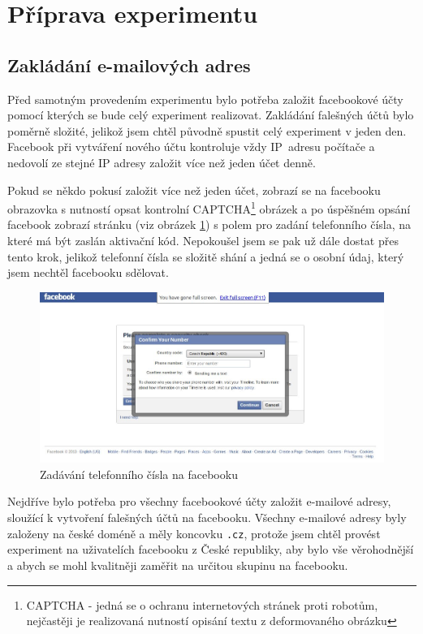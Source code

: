 \documentclass[thesis=M,czech]{FITthesis}[2013/05/10]
\begin{document}
\section{Příprava experimentu}

\subsection{Zakládání e-mailových adres}

Před samotným provedením experimentu bylo potřeba založit facebookové účty pomocí kterých se bude celý experiment realizovat. Zakládání falešných účtů bylo poměrně složité, jelikož jsem chtěl původně spustit celý experiment v jeden den. Facebook při vytváření nového účtu kontroluje vždy IP~adresu počítače a nedovolí ze stejné IP adresy založit více než jeden účet denně. 

Pokud se někdo pokusí založit více než jeden účet, zobrazí se na facebooku obrazovka s nutností opsat kontrolní CAPTCHA\footnote{CAPTCHA - jedná se o ochranu internetových stránek proti robotům, nejčastěji je realizovaná nutností opisání textu z deformovaného obrázku} obrázek a po úspěšném opsání facebook zobrazí stránku (viz obrázek \ref{fig:fbTelephoneNubmer}) s polem pro zadání telefonního čísla, na které má být zaslán aktivační kód. Nepokoušel jsem se pak už dále dostat přes tento krok, jelikož telefonní čísla se složitě shání a jedná se o osobní údaj, který jsem nechtěl facebooku sdělovat.

\begin{figure}[h]
\begin{center}
\includegraphics[width=5in]{figures/fb-telephone-number2.jpg}
\caption{Zadávání telefonního čísla na facebooku}
\label{fig:fbTelephoneNubmer}
\end{center}
\end{figure}

Nejdříve bylo potřeba pro všechny facebookové účty založit e-mailové adresy, sloužící k vytvoření falešných účtů na facebooku. Všechny e-mailové adresy byly založeny na české doméně a měly koncovku \verb|.cz|, protože jsem chtěl provést experiment na uživatelích facebooku z České republiky, aby bylo vše věrohodnější a abych se mohl kvalitněji zaměřit na určitou skupinu na facebooku. 
\end{document}
